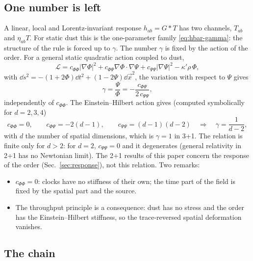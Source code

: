 \subsection{One number is left}

A linear, local and Lorentz-invariant response $h_{ab}=G*T$ has two channels, $T_{ab}$ and $\eta_{ab}T$.
For static dust this is the one-parameter family \eqref{eq:hbar-gamma}: the structure of the rule is
forced up to $\gamma$. The number $\gamma$ is fixed by the action of the order. For a general static
quadratic action coupled to dust,
\begin{equation}
  \mathcal L=c_{\Phi\Phi}|\nabla\Phi|^2+c_{\Phi\Psi}\nabla\Phi\cdot\nabla\Psi+c_{\Psi\Psi}|\nabla\Psi|^2
  -\kappa'\rho\,\Phi ,
\end{equation}
with $\dd s^2=-(1+2\Phi)\dd t^2+(1-2\Psi)\dd\vec x^2$, the variation with respect to $\Psi$ gives
\begin{equation}
  \gamma=\frac{\Psi}{\Phi}=-\frac{c_{\Phi\Psi}}{2\,c_{\Psi\Psi}},
\end{equation}
independently of $c_{\Phi\Phi}$. The Einstein--Hilbert action gives (computed symbolically for $d=2,3,4$)
\begin{equation}
  c_{\Phi\Phi}=0,\qquad c_{\Phi\Psi}=-2(d-1),\qquad c_{\Psi\Psi}=(d-1)(d-2)\quad\Rightarrow\quad
  \gamma=\frac{1}{d-2},
\end{equation}
with $d$ the number of spatial dimensions, which is $\gamma=1$ in 3+1. The relation is finite only for $d>2$: for
$d=2$, $c_{\Psi\Psi}=0$ and it degenerates (general relativity in 2+1 has no Newtonian limit). The 2+1 results
of this paper concern the response of the order (Sec.~\ref{sec:response}), not this relation. Two remarks:
\begin{itemize}
\item $c_{\Phi\Phi}=0$: clocks have no stiffness of their own; the time part of the field is fixed by
  the spatial part and the source.
\item The throughput principle is a consequence: dust has no stress and the order has the
  Einstein--Hilbert stiffness, so the trace-reversed spatial deformation vanishes.
\end{itemize}

\subsection{The chain}

